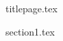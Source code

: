 \documentclass[a4paper, 12pt]{article}
\theoremstyle{definition}
\theoremstyle{plain}
\theoremstyle{remark}
\begin{document}
  {titlepage.tex}

  \tableofcontents
  \fontsize{14pt}{20pt}\selectfont
  \newpage
  \fontsize{14pt}{20pt}\selectfont

  {section1.tex}
    
\end{document}
